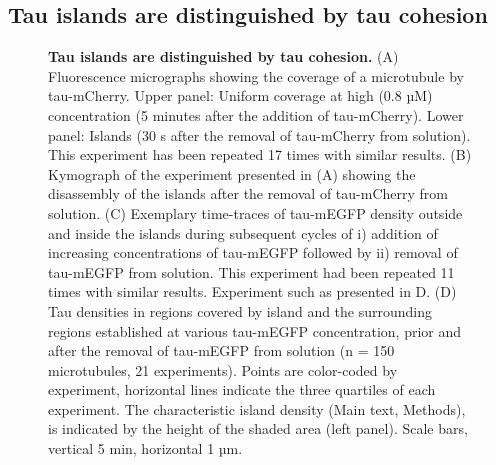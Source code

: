 \subsection{Tau islands are distinguished by tau cohesion}
\begin{figure}[h!tb]
\centering
\caption[Tau islands are distinguished by tau cohesion.]{
\textbf{Tau islands are distinguished by tau cohesion.} (A) Fluorescence micrographs showing the coverage of a microtubule by tau-mCherry. Upper panel: Uniform coverage at high (0.8 µM) concentration (5 minutes after the addition of tau-mCherry). Lower panel: Islands (30 s after the removal of tau-mCherry from solution). This experiment has been repeated 17 times with similar results. (B) Kymograph of the experiment presented in (A) showing the disassembly of the islands after the removal of tau-mCherry from solution. (C) Exemplary time-traces of tau-mEGFP density outside and inside the islands during subsequent cycles of i) addition of increasing concentrations of tau-mEGFP followed by ii) removal of tau-mEGFP from solution. This experiment had been repeated 11 times with similar results. Experiment such as presented in D. (D) Tau densities in regions covered by island and the surrounding regions established at various tau-mEGFP concentration, prior and after the removal of tau-mEGFP from solution (n = 150 microtubules, 21 experiments). Points are color-coded by experiment, horizontal lines indicate the three quartiles of each experiment. The characteristic island density (Main text, Methods), is indicated by the height of the shaded area (left panel). Scale bars, vertical 5 min, horizontal 1 µm.
	}\label{tau5}
\end{figure}
